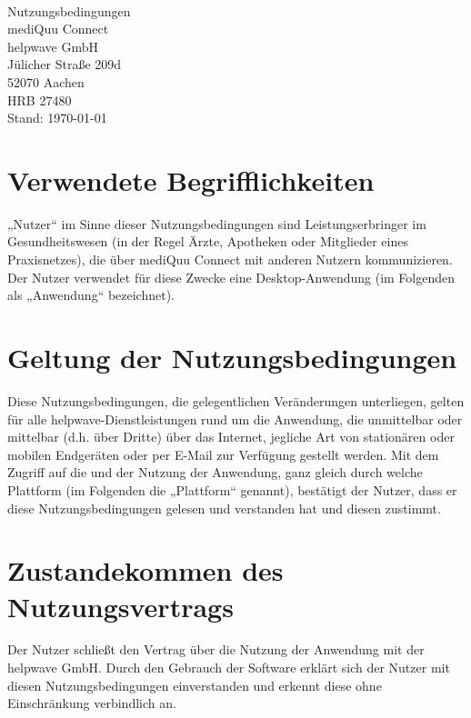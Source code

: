 \documentclass[10pt]{article}
\begin{document}
\begin{center}
	\\[4ex]
	{\Huge \sffamily
	Nutzungsbedingungen \\
	\huge mediQuu Connect}\\[2ex]

	\vspace{1em}
	{\large
		helpwave GmbH \\
		Jülicher Straße 209d \\
		52070 Aachen \\
		HRB 27480}\\
	\vspace{1em}
	Stand: \today
\end{center}

\vspace{2ex}

\tableofcontents

\newpage

\section{Verwendete Begrifflichkeiten}
„Nutzer“ im Sinne dieser Nutzungsbedingungen sind Leistungserbringer im Gesundheitswesen (in der Regel Ärzte, Apotheken oder Mitglieder eines Praxisnetzes), die über mediQuu Connect mit anderen Nutzern kommunizieren. Der Nutzer
verwendet für diese Zwecke eine Desktop-Anwendung (im Folgenden als „Anwendung“ bezeichnet).
\section{Geltung der Nutzungsbedingungen}
Diese Nutzungsbedingungen, die gelegentlichen Veränderungen unterliegen, gelten für alle helpwave-Dienstleistungen
rund um die Anwendung, die unmittelbar oder mittelbar (d.h. über Dritte) über das Internet, jegliche Art von stationären
oder mobilen Endgeräten oder per E-Mail zur Verfügung gestellt werden.
Mit dem Zugriff auf die und der Nutzung der Anwendung, ganz gleich durch welche Plattform (im Folgenden die „Plattform“
genannt), bestätigt der Nutzer, dass er diese Nutzungsbedingungen gelesen und verstanden hat und diesen zustimmt.

\section{Zustandekommen des Nutzungsvertrags}
Der Nutzer schließt den Vertrag über die Nutzung der Anwendung mit der helpwave GmbH. Durch den Gebrauch der Software erklärt sich der Nutzer mit diesen Nutzungsbedingungen einverstanden
und erkennt diese ohne Einschränkung verbindlich an.
\end{document}
